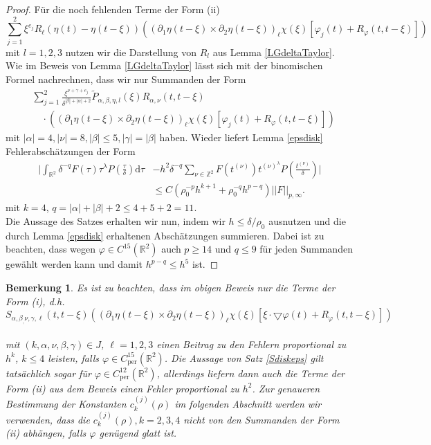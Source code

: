 \documentclass[12pt,a4paper]{scrartcl}
\newtheorem{Bemerkung}[Satz]{Bemerkung}
\newcommand{\dd}{\mathrm{d}}
\numberwithin{equation}{section}
\newcommand{\R}{\mathbb{R}} %
\newcommand{\Z}{\mathbb{Z}} %
\newcommand{\grad}{\bigtriangledown}
\newcommand{\per}{\operatorname{per}}
\begin{document}
\begin{proof}
Für die noch fehlenden Terme der Form (ii)
\[
\sum_{j=1}^2 \xi^{e_j} R_\ell(\eta(t)-\eta(t-\xi))\left((\partial_1 \eta (t-\xi) \times \partial_2 \eta(t-\xi))_\ell \chi(\xi)\left[\varphi_j(t) + R_\varphi(t,t-\xi) \right] \right) 
\] mit $l=1,2,3$ nutzen wir die Darstellung von $R_l$ aus Lemma \ref{LGdeltaTaylor}. Wie im Beweis von Lemma \ref{LGdeltaTaylor} lässt sich mit der binomischen Formel nachrechnen, dass wir nur Summanden der Form
\begin{align*}
&\sum_{j=1}^2 \frac{\xi^{\nu+\gamma+e_j}}{\delta^{|\beta|+|\alpha|+2}}\widetilde P_{\alpha,\beta,\eta,l}(\xi)R_{\alpha,\nu}(t,t-\xi) \\
&\quad \cdot \left((\partial_1 \eta (t-\xi) \times \partial_2 \eta(t-\xi))_\ell\chi(\xi)\left[\varphi_j(t) + R_\varphi(t,t-\xi) \right] \right)
\end{align*}
mit $|\alpha|=4, |\nu|=8, |\beta|\leq 5, |\gamma|=|\beta|$ haben. Wieder liefert Lemma \ref{epsdisk} Fehlerabschätzungen der Form
\begin{align*}
\bigg|\int_{\R^2} \delta^{-q}F(\tau)\tau^\lambda P\left(\frac{\tau}{\delta}\right) \dd \tau &- h^2 \delta^{-q} \sum_{\nu \in \Z^2}F(t^{(\nu)})t^{(\nu)^\lambda} P\left(\frac{t^{(\nu)}}{\delta}\right)\bigg| \\
&\leq C( \rho_0^{-p}h^{k+1}+\rho_0^{-q}h^{p-q})||F||_{p,\infty}.
\end{align*} mit $k=4$, $q= |\alpha| +|\beta| +2 \leq 4+5+2 = 11$. \\
 Die Aussage des Satzes erhalten wir nun, indem wir $h \leq \delta / \rho_0$ ausnutzen und die durch Lemma \ref{epsdisk} erhaltenen Abschätzungen summieren. Dabei ist zu beachten, dass wegen $\varphi \in C^{15}(\R^2)$ auch $p \geq 14$ und $q \leq  9$ für jeden Summanden gewählt werden kann und damit 
$h^{p-q} \leq h^5$ ist. 
\end{proof}
\begin{Bemerkung} \label{Bck12}
Es ist zu beachten, dass im obigen Beweis nur die Terme der Form (i), d.h.
\[
S_{\alpha,\beta_,\nu,\gamma,\ell}(t,t-\xi)\left((\partial_1 \eta (t-\xi) \times \partial_2 \eta(t-\xi))_\ell\chi(\xi)\left[\xi \cdot \grad\varphi(t) + R_\varphi(t,t-\xi) \right] \right)
\] 
\\
 mit $(k,\alpha,\nu,\beta,\gamma) \in J$, $\ell=1,2,3$ einen Beitrag zu den Fehlern proportional zu $h^k$, $k \leq 4$ leisten, falls $\varphi \in C_{\per}^{15}(\R^2)$. Die Aussage von Satz \ref{Sdiskeps} gilt tatsächlich sogar für
 $\varphi \in C_{\per}^{12}(\R^2)$, allerdings liefern dann auch die Terme der Form (ii) aus dem Beweis einen Fehler proportional zu $h^2$. Zur genaueren Bestimmung der Konstanten $c_k^{(j)}(\rho)$ im folgenden Abschnitt werden wir verwenden, dass die $c_k^{(j)}(\rho), k=2,3,4$ nicht von den Summanden der Form (ii) abhängen, falls $\varphi$ genügend glatt ist.
\end{Bemerkung}
\end{document}
